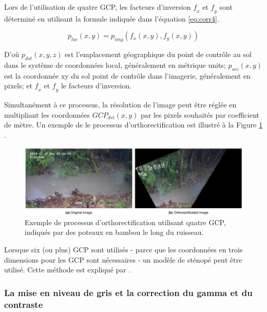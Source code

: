 \documentclass[
]{article}
\begin{document}
Lors de l'utilisation de quatre GCP, les facteurs d'inversion \(𝑓_𝑥\) et \(𝑓_𝑦\) sont
déterminé en utilisant la formule indiquée dans l'équation \eqref{eq:corr4}.

\begin{equation}
p_{loc}\left(x,y\right)=p_{img}\left(f_x\left(x,y\right), f_y\left(x,y\right)\right)
\label{eq:corr4}
\end{equation}

D'où \(𝑝_ {𝑑𝑠𝑡} \left (𝑥, 𝑦, 𝑧 \right)\) est l'emplacement géographique du
point de contrôle au sol dans le système de coordonnées local, généralement en métrique
units; \(𝑝_ {𝑠𝑟𝑐} \left (𝑥, 𝑦 \right)\) est la coordonnée xy du sol
point de contrôle dans l'imagerie, généralement en pixels; et \(𝑓_𝑥\) et \(𝑓_𝑦\) le
facteurs d'inversion.

Simultanément à ce processus, la résolution de l'image peut être réglée
en multipliant les coordonnées \(𝐺𝐶𝑃_ {𝑑𝑠𝑡} \left (𝑥, 𝑦 \right)\) par les
pixels souhaités par coefficient de mètre. Un exemple de
le processus d'orthorectification est illustré à la Figure \ref{fig:forthoafter} .



\begin{figure}
\includegraphics[width=1\linewidth]{images/ortho_after} \caption{Exemple de processus d'orthorectification utilisant quatre GCP, indiqués par des poteaux en bambou le long du ruisseau.}\label{fig:forthoafter}
\end{figure}

Lorsque six (ou plus) GCP sont utilisés - parce que les coordonnées en trois dimensions
pour les GCP sont nécessaires - un modèle de sténopé peut être utilisé. Cette méthode est
expliqué par \citep{jodeau_application_2008} .

\hypertarget{la-mise-en-niveau-de-gris-et-la-correction-du-gamma-et-du-contraste}{%
\subsubsection*{La mise en niveau de gris et la correction du gamma et du contraste}\label{la-mise-en-niveau-de-gris-et-la-correction-du-gamma-et-du-contraste}}
\end{document}
